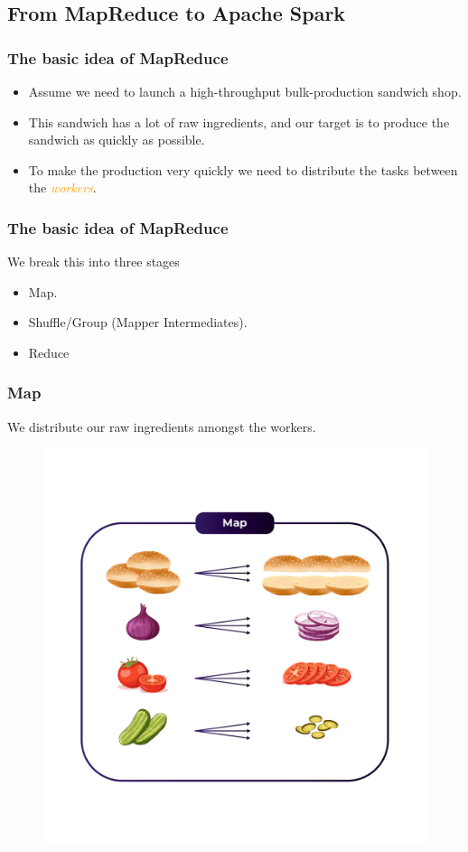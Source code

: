 \subsection{From MapReduce to Apache Spark}\label{subsec:from-mapreduce-to-apache-spark}

\begin{frame}
    \frametitle{The basic idea of MapReduce}
    \begin{itemize}
        [<+->]
        \item Assume we need to launch a high-throughput bulk-production sandwich shop.
        \item This sandwich has a lot of raw ingredients, and our target is to produce the sandwich as quickly as possible.
        \item To make the production very quickly we need to distribute the tasks between the  \textcolor{orange}{\textit{workers}}.
    \end{itemize}
\end{frame}
\begin{frame}
    \frametitle{The basic idea of MapReduce}
    We break this into three stages
    \begin{itemize}
        [<+->]
        \item Map.
        \item Shuffle/Group (Mapper Intermediates).
        \item Reduce
    \end{itemize}
\end{frame}
\begin{frame}
    \frametitle{Map}
    We distribute our raw ingredients amongst the workers.
    \begin{figure}
        \includegraphics[width=.5\textwidth,height=.8\textheight]{./Figures/chapter-04/map}\label{fig:map}
    \end{figure}
\end{frame}
